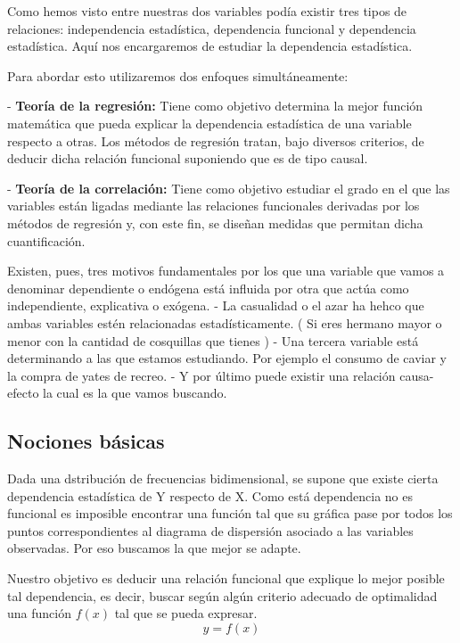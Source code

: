 \documentclass{article}
\begin{document}
	Como hemos visto entre nuestras dos variables podía existir tres tipos de relaciones: independencia estadística, dependencia funcional y dependencia estadística. Aquí nos encargaremos de estudiar la dependencia estadística.
	\vspace{2mm}
	
	Para abordar esto utilizaremos dos enfoques simultáneamente:
	
	 - \textbf{Teoría de la regresión:} Tiene como objetivo determina la mejor función matemática que pueda explicar la dependencia estadística de una variable respecto a otras. Los métodos de regresión tratan, bajo diversos criterios, de deducir dicha relación funcional suponiendo que es de tipo causal.
	 
	 \vspace{2mm}
	 - \textbf{Teoría de la correlación:} Tiene como objetivo estudiar el grado en el que las variables están ligadas mediante las relaciones funcionales derivadas por los métodos de regresión y, con este fin, se diseñan medidas que permitan dicha cuantificación.
	 
	 \vspace{2mm}
	 Existen, pues, tres motivos fundamentales por los que una variable que vamos a denominar dependiente o endógena está influida por otra que actúa como independiente, explicativa o exógena.
	 - La casualidad o el azar ha hehco que ambas variables estén relacionadas estadísticamente. ( Si eres hermano mayor o menor con la cantidad de cosquillas que tienes )
	 - Una tercera variable está determinando a las que estamos estudiando. Por ejemplo el consumo de caviar y la compra de yates de recreo.
	 - Y por último puede existir una relación causa-efecto la cual es la que vamos buscando.
	 \subsection{Nociones básicas}
	 
	 Dada una dstribución de frecuencias bidimensional, se supone que existe cierta dependencia estadística de Y respecto de X.
	 Como está dependencia no es funcional es imposible encontrar una función tal que su gráfica pase por todos los puntos correspondientes al diagrama de dispersión asociado a las variables observadas. Por eso buscamos la que mejor se adapte.
	 
	  Nuestro objetivo es deducir una relación funcional que explique lo mejor posible tal dependencia, es decir, buscar según algún criterio adecuado de optimalidad una función $f(x)$ tal que se pueda expresar.
	 $$ y = f(x) $$
	 
\end{document}
